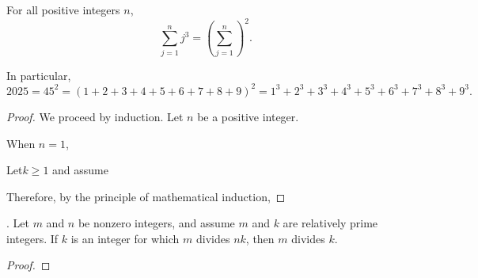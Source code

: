 \documentclass{article}
\begin{document}
\clearpage



\begin{prop*}[Problem CG 2025.] For all positive integers $n$,
\[
    \sum_{j=1}^n j^3 = \left(\sum_{j=1}^n\right)^2.
\]

In particular, \[2025 = 45^2 = (1 + 2 + 3 + 4 + 5 + 6 + 7 + 8 + 9)^2 = 1^3 + 2^3 + 3^3 + 4^3 + 5^3 + 6^3 + 7^3 + 8^3 + 9^3.\]
\end{prop*}

\begin{proof} 
    We proceed by induction. Let $n$ be a positive integer.

    When $n = 1$, %

    Let$k \geq 1$ and assume


    Therefore, by the principle of mathematical induction, %
\end{proof}

\begin{prop*}[Chapter 1, \#39]. Let $m$ and $n$ be nonzero integers, and assume $m$ and $k$ are relatively prime integers. If $k$ is an integer for which $m$ divides $nk$, then $m$ divides $k$.
\end{prop*}

\begin{proof}


\end{proof}

\end{document}
